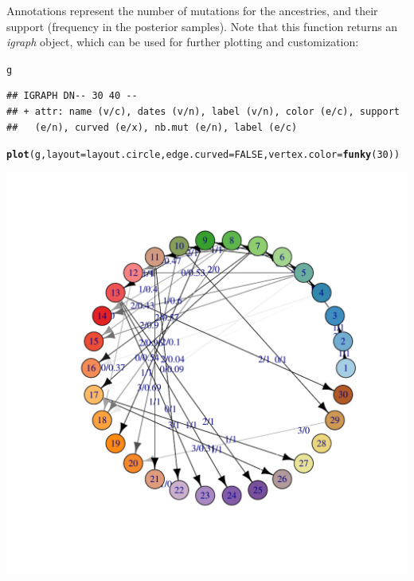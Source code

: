 \documentclass{article}\usepackage[]{graphicx}\usepackage[]{color}
\makeatletter
\newcommand{\hlnum}[1]{\textcolor[rgb]{0.686,0.059,0.569}{#1}}%
\newcommand{\hlstd}[1]{\textcolor[rgb]{0.345,0.345,0.345}{#1}}%
\newcommand{\hlkwc}[1]{\textcolor[rgb]{0.333,0.667,0.333}{#1}}%
\newcommand{\hlkwd}[1]{\textcolor[rgb]{0.737,0.353,0.396}{\textbf{#1}}}%
\newenvironment{kframe}{%
 \def\at@end@of@kframe{}%
 \ifinner\ifhmode%
  \def\at@end@of@kframe{\end{minipage}}%
  \begin{minipage}{\columnwidth}%
 \fi\fi%
 \def\FrameCommand##1{\hskip\@totalleftmargin \hskip-\fboxsep
 \colorbox{shadecolor}{##1}\hskip-\fboxsep
     \hskip-\linewidth \hskip-\@totalleftmargin \hskip\columnwidth}%
 \MakeFramed {\advance\hsize-\width
   \@totalleftmargin\z@ \linewidth\hsize
   \@setminipage}}%
 {\par\unskip\endMakeFramed%
 \at@end@of@kframe}
\newenvironment{knitrout}{}{} %
\makeatother
\begin{document}
Annotations represent the number of mutations for the ancestries, and their support (frequency in
the posterior samples).
Note that this function returns an \textit{igraph} object, which can be used for further plotting
and customization:
\begin{knitrout}
\color{fgcolor}\begin{kframe}
\begin{alltt}
\hlstd{g}
\end{alltt}
\begin{verbatim}
## IGRAPH DN-- 30 40 -- 
## + attr: name (v/c), dates (v/n), label (v/n), color (e/c), support
##   (e/n), curved (e/x), nb.mut (e/n), label (e/c)
\end{verbatim}
\begin{alltt}
\hlkwd{plot}\hlstd{(g,} \hlkwc{layout}\hlstd{=layout.circle,} \hlkwc{edge.curved}\hlstd{=}\hlnum{FALSE}\hlstd{,} \hlkwc{vertex.color}\hlstd{=}\hlkwd{funky}\hlstd{(}\hlnum{30}\hlstd{))}
\end{alltt}
\end{kframe}

{\centering \includegraphics[width=.6\textwidth]{figs/unnamed-chunk-21} 

}



\end{knitrout}
\end{document}
